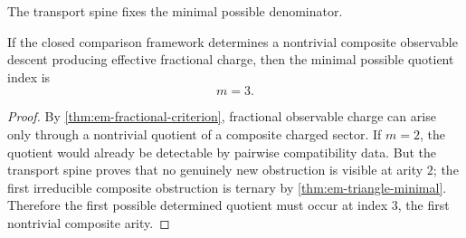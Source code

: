 The transport spine fixes the minimal possible denominator.
\begin{theorem}
	\label{thm:em-minimal-composite-index}
	If the closed comparison framework determines a nontrivial composite
	observable descent producing effective fractional charge, then the
	minimal possible quotient index is
	\[
		m=3.
	\]
\end{theorem}
\begin{proof}
	By \cref{thm:em-fractional-criterion}, fractional observable charge can
	arise only through a nontrivial quotient of a composite charged sector.
	If \(m=2\), the quotient would already be detectable by pairwise
	compatibility data.
	But the transport spine proves that no genuinely new obstruction is
	visible at arity \(2\); the first irreducible composite obstruction is
	ternary by \cref{thm:em-triangle-minimal}.
	Therefore the first possible determined quotient must occur at index \(3\),
	the first nontrivial composite arity.
\end{proof}
